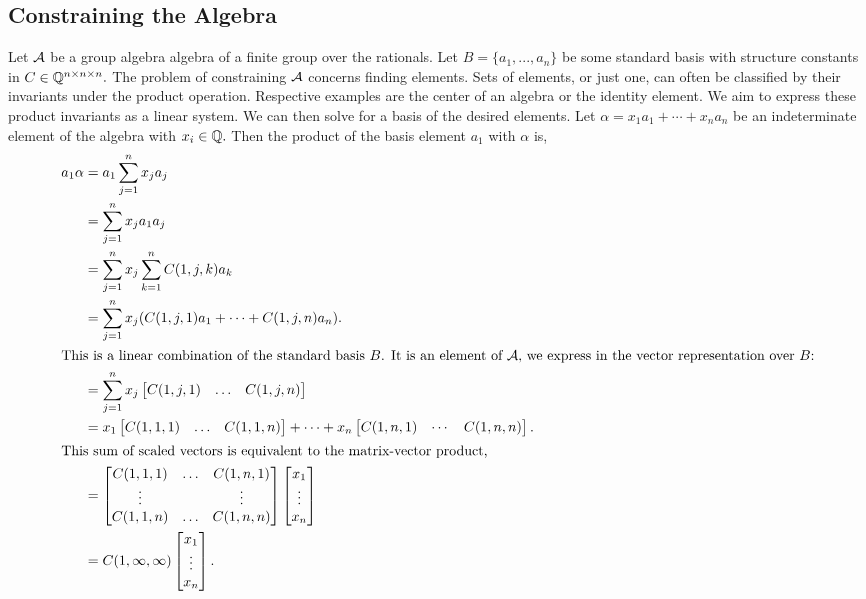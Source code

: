 \documentclass[../thesis.tex]{subfiles}
\begin{document}
\subsection{Constraining the Algebra}\label{sec:FindingSubalgebras}
Let $\mathcal{A}$ be a group algebra algebra of a finite group over the rationals. Let $B=\{a_1,...,a_n\}$ be some standard basis with structure constants in $C\in\mathbb{Q}^{n\times n\times n}.$ The problem of constraining $\mathcal{A}$ concerns finding elements. Sets of elements, or just one, can often be classified by their invariants under the product operation. Respective examples are the center of an algebra or the identity element. We aim to express these product invariants as a linear system. We can then solve for a basis of the desired elements. Let $\alpha = x_1a_1+\cdots+x_na_n$ be an indeterminate element of the algebra with $x_i\in\mathbb{Q}.$ Then the product of the basis element $a_1$ with $\alpha$ is,
\begin{align*}
    a_1\alpha &= a_1\sum_{j=1}^n x_ja_j\\ 
              &= \sum_{j=1}^n x_ja_1a_j\\
              &= \sum_{j=1}^n x_j \sum_{k=1}^n C(1,j,k)a_k\\
              &= \sum_{j=1}^n x_j(C(1,j,1)a_1+\cdots+C(1,j,n)a_n).\\
\intertext{This is a linear combination of the standard basis $B$. It is an element of $\mathcal{A}$, we express in the vector representation over $B$:}
              &= \sum_{j=1}^n x_j\begin{bmatrix}C(1,j,1)&\hdots&C(1,j,n)\end{bmatrix}\\
              &=x_1\begin{bmatrix}
                  C(1,1,1)&\hdots&C(1,1,n)
                \end{bmatrix} + \cdots + 
                x_n\begin{bmatrix}
                    C(1,n,1) &\cdots&C(1,n,n)
                \end{bmatrix}.\\
\intertext{This sum of scaled vectors is equivalent to the matrix-vector product,}
              &= \begin{bmatrix}
                  C(1,1,1) & \hdots & C(1,n,1)\\
                  \vdots & & \vdots\\
                  C(1,1,n) & \hdots & C(1,n,n)\\
              \end{bmatrix}
              \begin{bmatrix}
                  x_1\\\vdots\\x_n
              \end{bmatrix}\\
              &= C(1,\infty,\infty)
              \begin{bmatrix}
                  x_1\\\vdots\\x_n
              \end{bmatrix}.\\
\end{align*}
\end{document}
